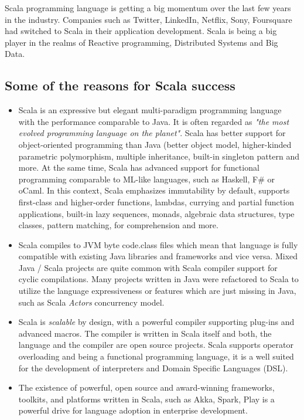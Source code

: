\documentclass[12pt,twoside,a4paper]{report}
\begin{document}
Scala programming language \cite{2} is getting a big momentum over the last few years in the industry\cite{3}. Companies such as Twitter, LinkedIn\cite{4}, Netflix, Sony, Foursquare had switched to Scala in their application development. Scala is being a big player in the realms of Reactive programming, Distributed Systems and Big Data\cite{5}.

\subsection{Some of the reasons for Scala success}\label{1.1.1}
\begin{itemize}\itemsep1pt \parskip0pt 
\item Scala is an expressive but elegant multi-paradigm programming language with the performance comparable to Java. It is often regarded as \emph{"the most evolved programming language on the planet"}. Scala has better support for object-oriented programming than Java (better object model, higher-kinded parametric polymorphism, multiple inheritance, built-in singleton pattern and more. At the same time, Scala has advanced support for functional programming comparable to ML-like languages, such as Haskell, F\# or oCaml. In this context, Scala emphasizes immutability by default, supports first-class and higher-order functions, lambdas, currying and partial function applications, built-in lazy sequences, monads, algebraic data structures, type classes, pattern matching, for comprehension and more.
\item Scala compiles to JVM byte code.class files which mean that language is fully compatible with existing Java libraries and frameworks and vice versa. Mixed Java / Scala projects are quite common with Scala compiler support for cyclic compilations. Many projects written in Java were refactored to Scala to utilize the language expressiveness or features which are just missing in Java, such as Scala \emph{Actors} concurrency model.
\item Scala is \emph{scalable} by design, with a powerful compiler supporting plug-ins and advanced macros. The compiler is written in Scala itself and both, the language and the compiler are open source projects. Scala supports operator overloading and being a functional programming language, it is a well suited for the development of interpreters and Domain Specific Languages (DSL).
\item The existence of powerful, open source and award-winning frameworks\cite{6}, toolkits, and platforms written in Scala, such as Akka, Spark, Play\cite{7} is a powerful drive for language adoption in enterprise development.
\end{itemize}
\end{document}
